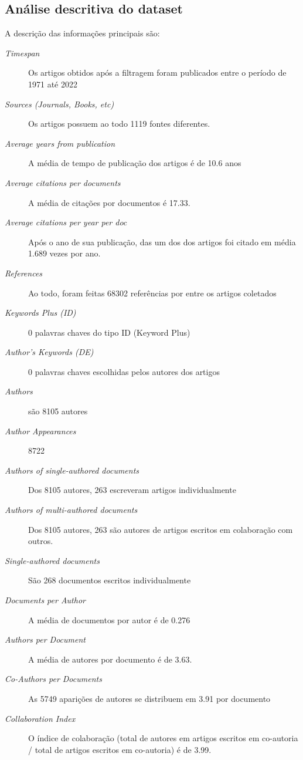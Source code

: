 \subsection{Análise descritiva do dataset}

A descrição das informações principais são:

\begin{description}
    \item [\textit{Timespan}] Os artigos obtidos após a filtragem foram publicados entre o período de 1971 até 2022
    \item [\textit{Sources (Journals, Books, etc)}] Os artigos possuem ao todo 1119 fontes diferentes.
    \item [\textit{Average years from publication}] A média de tempo de publicação dos artigos é de 10.6 anos
    \item [\textit{Average citations per documents}] A média de citações por documentos é 17.33.
    \item [\textit{Average citations per year per doc}] Após o ano de sua publicação, das um dos dos artigos foi citado em média 1.689 vezes por ano.
    \item [\textit{References}] Ao todo, foram feitas 68302 referências por entre os artigos coletados
    \item [\textit{Keywords Plus (ID)}] 0 palavras chaves do tipo ID (Keyword Plus)
    \item [\textit{Author's Keywords (DE)}]  0 palavras chaves escolhidas pelos autores dos artigos

    \item [\textit{Authors}]  são 8105 autores
    \item [\textit{Author Appearances}] 8722
    \item [\textit{Authors of single-authored documents}] Dos 8105 autores, 263 escreveram artigos individualmente
    \item [\textit{Authors of multi-authored documents}] Dos 8105 autores, 263 são autores de artigos escritos em colaboração com outros.
    \item [\textit{Single-authored documents}] São 268 documentos escritos individualmente
    \item [\textit{Documents per Author}] A média de documentos por autor é de 0.276
    \item [\textit{Authors per Document}] A média de autores por documento é de 3.63.
    \item [\textit{Co-Authors per Documents}] As 5749 aparições de autores se distribuem em 3.91 por documento
    \item [\textit{Collaboration Index}] O índice de colaboração (total de autores em artigos escritos em co-autoria / total de artigos escritos em co-autoria) é de 3.99.
\end{description}



